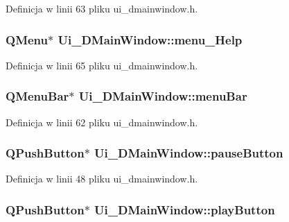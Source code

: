 Definicja w linii 63 pliku ui\+\_\+dmainwindow.\+h.

\hypertarget{class_ui___d_main_window_ac2997077098614d72b21d29c7a48350c}{}
\subsubsection[{menu\+\_\+\+Help}]{\setlength{\rightskip}{0pt plus 5cm}Q\+Menu$\ast$ Ui\+\_\+\+D\+Main\+Window\+::menu\+\_\+\+Help}\label{class_ui___d_main_window_ac2997077098614d72b21d29c7a48350c}


Definicja w linii 65 pliku ui\+\_\+dmainwindow.\+h.

\hypertarget{class_ui___d_main_window_a788ef749d82ca070e467e55cca0d47dd}{}
\subsubsection[{menu\+Bar}]{\setlength{\rightskip}{0pt plus 5cm}Q\+Menu\+Bar$\ast$ Ui\+\_\+\+D\+Main\+Window\+::menu\+Bar}\label{class_ui___d_main_window_a788ef749d82ca070e467e55cca0d47dd}


Definicja w linii 62 pliku ui\+\_\+dmainwindow.\+h.

\hypertarget{class_ui___d_main_window_a70e142e35db4995a1fefa082406bdef3}{}
\subsubsection[{pause\+Button}]{\setlength{\rightskip}{0pt plus 5cm}Q\+Push\+Button$\ast$ Ui\+\_\+\+D\+Main\+Window\+::pause\+Button}\label{class_ui___d_main_window_a70e142e35db4995a1fefa082406bdef3}


Definicja w linii 48 pliku ui\+\_\+dmainwindow.\+h.

\hypertarget{class_ui___d_main_window_ad87cbf39ac14374923ed2a2b11e8b1bf}{}
\subsubsection[{play\+Button}]{\setlength{\rightskip}{0pt plus 5cm}Q\+Push\+Button$\ast$ Ui\+\_\+\+D\+Main\+Window\+::play\+Button}\label{class_ui___d_main_window_ad87cbf39ac14374923ed2a2b11e8b1bf}


